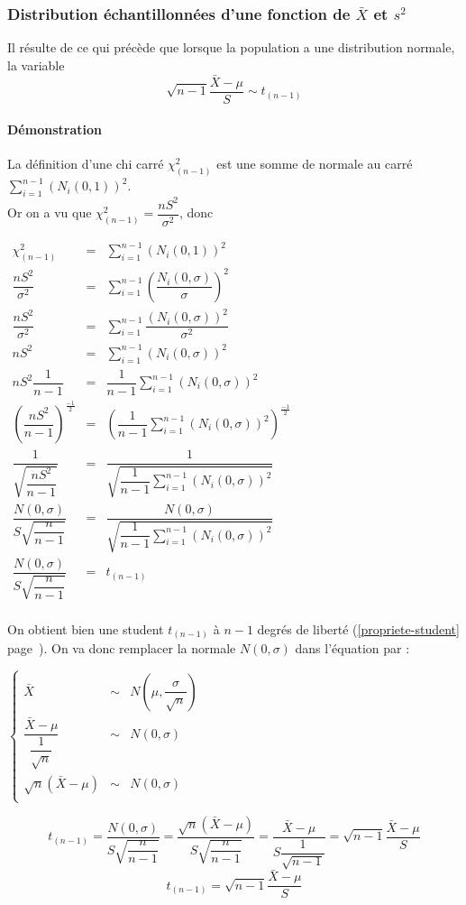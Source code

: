 \newpage
\subsubsection{Distribution échantillonnées d'une fonction de $\bar{X}$ et $s^2$}
Il résulte de ce qui précède que lorsque la population a une distribution normale, la variable
$$\boxed{\sqrt{n-1}\dfrac{\bar{X}-\mu}{S} \sim t_{(n-1)}}$$
\paragraph{Démonstration} La définition d'une chi carré $\chi^2_{(n-1)}$ est une somme de normale au carré $\displaystyle\sum_{i=1}^{n-1} (N_i(0,1))^2$.\\Or on a vu que $\chi^2_{(n-1)} = \dfrac{nS^2}{\sigma^2}$, donc
\begin{center}
$\begin{array}{LCL}
\chi^2_{(n-1)} &=& \sum_{i=1}^{n-1} (N_i(0,1))^2\\
\dfrac{nS^2}{\sigma^2} &=& \sum_{i=1}^{n-1} \left(\dfrac{N_i(0,\sigma)}{\sigma}\right)^2\\
\dfrac{nS^2}{\sigma^2} &=& \sum_{i=1}^{n-1} \dfrac{(N_i(0,\sigma))^2}{\sigma^2}\\
nS^2 &=& \sum_{i=1}^{n-1} (N_i(0,\sigma))^2\\
nS^2 \dfrac{1}{n-1}&=& \dfrac{1}{n-1} \sum_{i=1}^{n-1} (N_i(0,\sigma))^2\\
\left(\dfrac{nS^2}{n-1}\right)^{\frac{-1}{2}} &=& \left(\dfrac{1}{n-1} \sum_{i=1}^{n-1} (N_i(0,\sigma))^2 \right)^{\frac{-1}{2}}\\
\dfrac{1}{\sqrt{\dfrac{nS^2}{n-1}}} &=& \dfrac{1}{\sqrt{\dfrac{1}{n-1} \displaystyle\sum_{i=1}^{n-1} (N_i(0,\sigma))^2}}\\
\dfrac{N(0,\sigma)}{S\sqrt{\dfrac{n}{n-1}}} &=& \dfrac{N(0,\sigma)}{\sqrt{\dfrac{1}{n-1} \displaystyle\sum_{i=1}^{n-1} (N_i(0,\sigma))^2}}\\
\dfrac{N(0,\sigma)}{S\sqrt{\dfrac{n}{n-1}}} &=& t_{(n-1)}\\
\end{array}$
\end{center}
On obtient bien une student $t_{(n-1)}$ à $n-1$ degrés de liberté (\ref{propriete-student} page~\pageref{propriete-student}). On va donc remplacer la normale $N(0,\sigma)$ dans l'équation par :
\begin{center}
$\left\{\begin{array}{LCLL}
\bar{X} &\sim& N\left(\mu,\dfrac{\sigma}{\sqrt{n}}\right)\\
\dfrac{\bar{X}-\mu}{\dfrac{1}{\sqrt{n}}} &\sim& N(0,\sigma)\\
\sqrt{n}\left(\bar{X}-\mu\right) &\sim& N(0,\sigma)\\
\end{array}\right.$
\end{center}
$$t_{(n-1)} = \dfrac{N(0,\sigma)}{S\sqrt{\dfrac{n}{n-1}}} = \dfrac{\sqrt{n}\left(\bar{X}-\mu\right)}{S\sqrt{\dfrac{n}{n-1}}} = \dfrac{\bar{X}-\mu}{S\dfrac{1}{\sqrt{n-1}}} = \sqrt{n-1}\dfrac{\bar{X}-\mu}{S}$$
$$\boxed{t_{(n-1)} = \sqrt{n-1}\dfrac{\bar{X}-\mu}{S}}$$